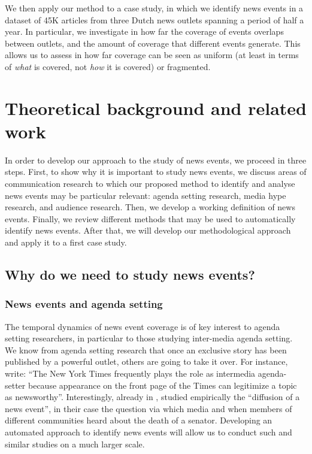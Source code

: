 \documentclass[a4paper,man,natbib,floatsintext,mask]{apa6}
\begin{document}
We then apply our method to a case study, in which we identify news events in a dataset of 45K articles from three Dutch news outlets spanning a period  of half a year.
In particular, we investigate in how far the coverage of events overlaps between outlets, and the amount of coverage that different events generate.
This allows us to assess in how far coverage can be seen as uniform (at least in terms of \emph{what} is covered, not \emph{how} it is covered) or fragmented.




\section{Theoretical background and related work}

In order to develop our approach to the study of news events, we proceed in three steps. 
First, to show why it is important to study news events, we discuss areas of communication research to which our proposed method to identify and analyse news events may be particular relevant: agenda setting research, media hype research, and audience research.
Then, we develop a working definition of news events.
Finally, we review different methods that may be used to automatically identify news events.
After that, we will develop our methodological approach and apply it to a first case study.


\subsection{Why do we need to study news events?}
\subsubsection{News events and agenda setting}
The temporal dynamics of news event coverage is of key interest to agenda setting researchers, in particular to those studying inter-media agenda setting.
We know from agenda setting research that once an exclusive story has been published by a powerful outlet, others are going to take it over.
For instance, \citet[p.~12]{mccombs2009} write: ``The New York Times frequently plays the role as intermedia agenda-setter because appearance on the front page of the Times can legitimize a topic as newsworthy''.
Interestingly, already in \citeyear{Larsen1954}, \cite{Larsen1954} studied empirically the ``diffusion of a news event'', in their case the question via which media and when members of different communities heard about the death of a senator. Developing an automated approach to identify news events will allow us to conduct such and similar studies on a much larger scale.
\end{document}
